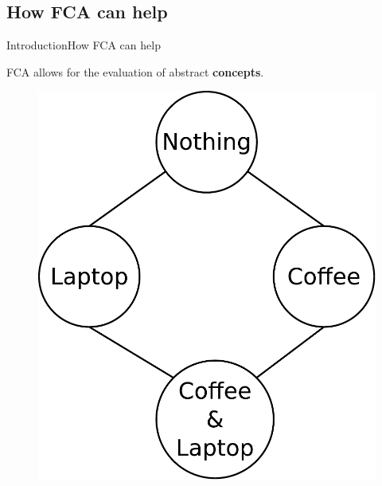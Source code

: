\subsection{How FCA can help}
\begin{frame}{Introduction}{How FCA can help}

\vspace{0.3cm}

FCA allows for the evaluation of abstract \textbf{concepts}.

\vspace{0.2cm}

\begin{figure}[ht]
\begin{minipage}[b]{0.5\linewidth}
\centering
\includegraphics[width=\textwidth]{img/introduction/coffee_laptop.pdf}
\end{minipage}
\end{figure}

\end{frame}